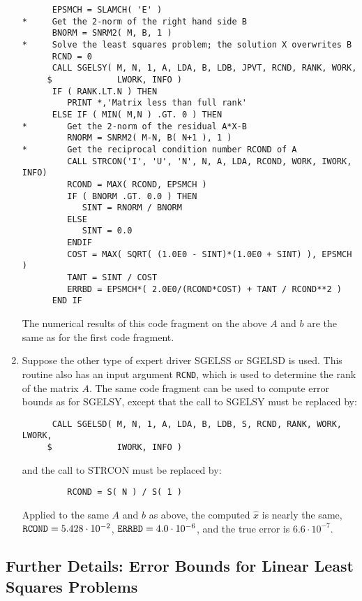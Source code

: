 \begin{enumerate}
\begin{verbatim}
      EPSMCH = SLAMCH( 'E' )
*     Get the 2-norm of the right hand side B
      BNORM = SNRM2( M, B, 1 )
*     Solve the least squares problem; the solution X overwrites B
      RCND = 0
      CALL SGELSY( M, N, 1, A, LDA, B, LDB, JPVT, RCND, RANK, WORK,
     $             LWORK, INFO )
      IF ( RANK.LT.N ) THEN
         PRINT *,'Matrix less than full rank'
      ELSE IF ( MIN( M,N ) .GT. 0 ) THEN
*        Get the 2-norm of the residual A*X-B
         RNORM = SNRM2( M-N, B( N+1 ), 1 )
*        Get the reciprocal condition number RCOND of A
         CALL STRCON('I', 'U', 'N', N, A, LDA, RCOND, WORK, IWORK, INFO)
         RCOND = MAX( RCOND, EPSMCH )
         IF ( BNORM .GT. 0.0 ) THEN
            SINT = RNORM / BNORM
         ELSE
            SINT = 0.0
         ENDIF
         COST = MAX( SQRT( (1.0E0 - SINT)*(1.0E0 + SINT) ), EPSMCH )
         TANT = SINT / COST
         ERRBD = EPSMCH*( 2.0E0/(RCOND*COST) + TANT / RCOND**2 )
      END IF
\end{verbatim}
The numerical results of this code fragment on the above $A$ and $b$ are
the same as for the first code fragment.

\item Suppose the other type of expert driver SGELSS or SGELSD is
used.
This routine also has an input argument {\tt RCND}, which is used to
determine the rank of the matrix $A$. The same code fragment can be used
to compute error bounds as for SGELSY,
except that the call to SGELSY must
be replaced by:

\begin{verbatim}
      CALL SGELSD( M, N, 1, A, LDA, B, LDB, S, RCND, RANK, WORK, LWORK,
     $             IWORK, INFO )
\end{verbatim}

and the call to STRCON must be replaced by:

\begin{verbatim}
         RCOND = S( N ) / S( 1 )
\end{verbatim}

Applied to the same $A$ and $b$ as above, the computed $\hat{x}$ is
nearly the same,
${\tt RCOND} = 5.428 \cdot 10^{-2}$,
${\tt ERRBD} = 4.0 \cdot 10^{-6}$, and the true error is
$6.6 \cdot 10^{-7}$.

\end{enumerate}

\subsection{Further Details:  Error Bounds for Linear Least Squares
Problems}\label{secbackgroundlsq}

